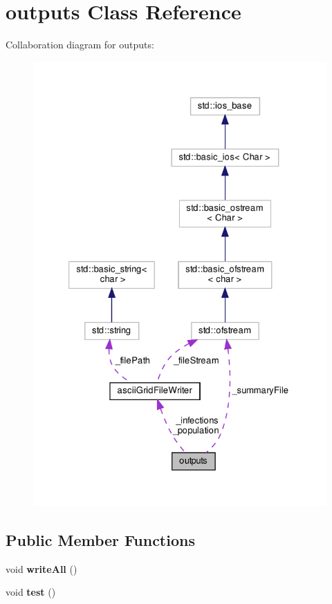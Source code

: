 \hypertarget{classoutputs}{}\section{outputs Class Reference}
\label{classoutputs}


Collaboration diagram for outputs\+:\nopagebreak
\begin{figure}[H]
\begin{center}
\leavevmode
\includegraphics[width=326pt]{classoutputs__coll__graph}
\end{center}
\end{figure}
\subsection*{Public Member Functions}
\begin{DoxyCompactItemize}
\item 
\mbox{\label{classoutputs_a84e606322d80c26a9afd60f25d3d9fba}} 
void {\bfseries write\+All} ()
\item 
\mbox{\label{classoutputs_aca2eded868d51846d8521ea6534bd227}} 
void {\bfseries test} ()
\end{DoxyCompactItemize}
